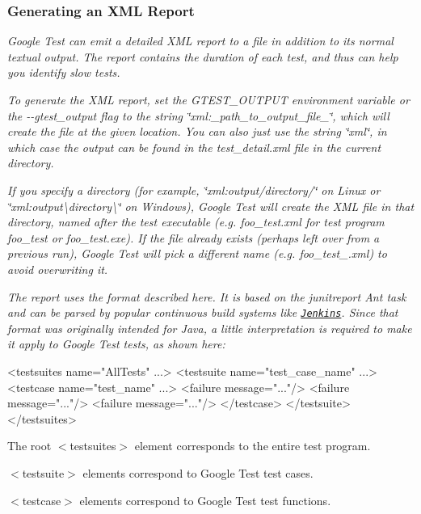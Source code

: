 {\itshape \subsubsection*{Generating an X\+ML Report}}

{\itshape }

{\itshape Google Test can emit a detailed X\+ML report to a file in addition to its normal textual output. The report contains the duration of each test, and thus can help you identify slow tests.}

{\itshape To generate the X\+ML report, set the {\ttfamily G\+T\+E\+S\+T\+\_\+\+O\+U\+T\+P\+UT} environment variable or the {\ttfamily -\/-\/gtest\+\_\+output} flag to the string {\ttfamily \char`\"{}xml\+:\+\_\+path\+\_\+to\+\_\+output\+\_\+file\+\_\+\char`\"{}}, which will create the file at the given location. You can also just use the string {\ttfamily \char`\"{}xml\char`\"{}}, in which case the output can be found in the {\ttfamily test\+\_\+detail.\+xml} file in the current directory.}

{\itshape If you specify a directory (for example, {\ttfamily \char`\"{}xml\+:output/directory/\char`\"{}} on Linux or {\ttfamily \char`\"{}xml\+:output\textbackslash{}directory\textbackslash{}\char`\"{}} on Windows), Google Test will create the X\+ML file in that directory, named after the test executable (e.\+g. {\ttfamily foo\+\_\+test.\+xml} for test program {\ttfamily foo\+\_\+test} or {\ttfamily foo\+\_\+test.\+exe}). If the file already exists (perhaps left over from a previous run), Google Test will pick a different name (e.\+g. {\ttfamily foo\+\_\+test\+\_.\+xml}) to avoid overwriting it.}

{\itshape The report uses the format described here. It is based on the {\ttfamily junitreport} Ant task and can be parsed by popular continuous build systems like \href{http://jenkins-ci.org/}{\tt Jenkins}. Since that format was originally intended for Java, a little interpretation is required to make it apply to Google Test tests, as shown here\+:}

{\itshape 
\begin{DoxyCode}
<testsuites name="AllTests" ...>
  <testsuite name="test\_case\_name" ...>
    <testcase name="test\_name" ...>
      <failure message="..."/>
      <failure message="..."/>
      <failure message="..."/>
    </testcase>
  </testsuite>
</testsuites>
\end{DoxyCode}
}

{\itshape 
\begin{DoxyItemize}
\item The root {\ttfamily $<$testsuites$>$} element corresponds to the entire test program.
\item {\ttfamily $<$testsuite$>$} elements correspond to Google Test test cases.
\item {\ttfamily $<$testcase$>$} elements correspond to Google Test test functions.
\end{DoxyItemize}}

